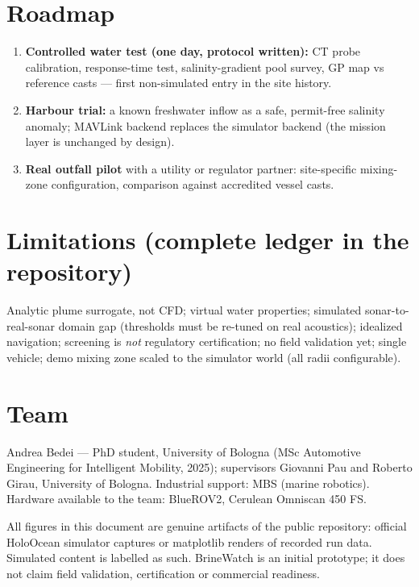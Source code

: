 \documentclass[10pt,a4paper]{article}
\begin{document}
\section{Roadmap}
\begin{enumerate}
\item \textbf{Controlled water test (one day, protocol written):} CT probe
  calibration, response-time test, salinity-gradient pool survey, GP map
  vs reference casts — first non-simulated entry in the site history.
\item \textbf{Harbour trial:} a known freshwater inflow as a safe,
  permit-free salinity anomaly; MAVLink backend replaces the simulator
  backend (the mission layer is unchanged by design).
\item \textbf{Real outfall pilot} with a utility or regulator partner:
  site-specific mixing-zone configuration, comparison against accredited
  vessel casts.
\end{enumerate}

\section{Limitations (complete ledger in the repository)}
Analytic plume surrogate, not CFD; virtual water properties; simulated
sonar-to-real-sonar domain gap (thresholds must be re-tuned on real
acoustics); idealized navigation; screening is \emph{not} regulatory
certification; no field validation yet; single vehicle; demo mixing zone
scaled to the simulator world (all radii configurable).

\section{Team}
Andrea Bedei — PhD student, University of Bologna (MSc Automotive
Engineering for Intelligent Mobility, 2025); supervisors Giovanni Pau and
Roberto Girau, University of Bologna. Industrial support: MBS (marine
robotics). Hardware available to the team: BlueROV2, Cerulean Omniscan
450 FS.

\vspace{3pt}
{\footnotesize All figures in this document are genuine artifacts of the
public repository: official HoloOcean simulator captures or matplotlib
renders of recorded run data. Simulated content is labelled as such.
BrineWatch is an initial prototype; it does not claim field validation,
certification or commercial readiness.}
\end{document}
